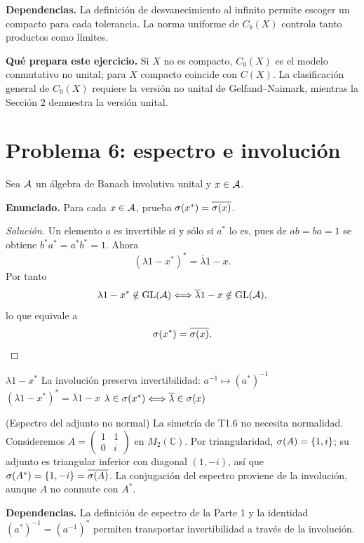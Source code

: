 \noindent\textbf{Dependencias.} La definición de desvanecimiento al infinito permite escoger un compacto para cada tolerancia. La norma uniforme de $C_b(X)$ controla tanto productos como límites.

\noindent\textbf{Qué prepara este ejercicio.} Si $X$ no es compacto, $C_0(X)$ es el modelo conmutativo no unital; para $X$ compacto coincide con $C(X)$. La clasificación general de $C_0(X)$ requiere la versión no unital de Gelfand--Naimark, mientras la Sección 2 demuestra la versión unital.

\section{Problema 6: espectro e involución}

Sea $\mathcal A$ un álgebra de Banach involutiva unital y $x\in\mathcal A$.

\noindent\textbf{Enunciado.} Para cada $x\in\mathcal A$, prueba $\sigma(x^*)=\overline{\sigma(x)}$.

\begin{proof}[Solución]
Un elemento $a$ es invertible si y sólo si $a^*$ lo es, pues de $ab=ba=1$ se obtiene
$b^*a^*=a^*b^*=1$. Ahora
\[
(\lambda1-x^*)^*=\overline\lambda1-x.
\]
Por tanto
\[
\lambda1-x^*\notin\operatorname{GL}(\mathcal A)
\Longleftrightarrow
\overline\lambda1-x\notin\operatorname{GL}(\mathcal A),
\]
lo que equivale a
\[
 \sigma(x^*)=\overline{\sigma(x)}.
\]
\end{proof}

\proofdiagram
{$\lambda1-x^*$}
{La involución preserva invertibilidad: $a^{-1}\mapsto(a^*)^{-1}$}
{$(\lambda1-x^*)^*=\overline\lambda1-x$}
{$\lambda\in\sigma(x^*)\Longleftrightarrow\overline\lambda\in\sigma(x)$}

\begin{cthejemplo}{(Espectro del adjunto no normal)}
La simetría de T1.6 no necesita normalidad. Consideremos
$A=\begin{pmatrix}1&1\\0&i\end{pmatrix}$ en $M_2(\mathbb C)$.
Por triangularidad, $\sigma(A)=\{1,i\}$; su adjunto es triangular inferior con diagonal
$(1,-i)$, así que $\sigma(A^*)=\{1,-i\}=\overline{\sigma(A)}$.
La conjugación del espectro proviene de la involución, aunque $A$ no conmute con $A^*$.
\end{cthejemplo}

\noindent\textbf{Dependencias.} La definición de espectro de la Parte 1 y la identidad $(a^*)^{-1}=(a^{-1})^*$ permiten transportar invertibilidad a través de la involución.


